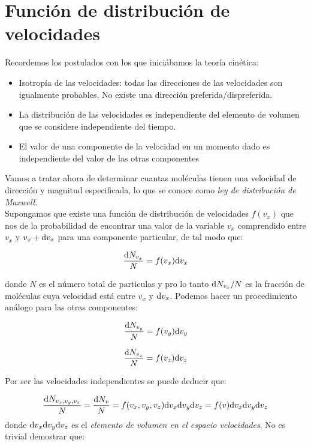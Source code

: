 \documentclass[12pt]{book}
\begin{document}
\section{Función de distribución de velocidades}

Recordemos los postulados con los que iniciábamos la teoría cinética:

\begin{itemize}
\item Isotropía de las velocidades: todas las direcciones de las velocidades son igualmente probables. No existe una dirección preferida/dispreferida.
\item La distribución de las velocidades es independiente del elemento de volumen que se considere independiente del tiempo.
\item El valor de una componente de la velocidad en un momento dado es independiente del valor de las otras componentes
\end{itemize}

Vamos a tratar ahora de determinar cuantas moléculas tienen una velocidad de dirección y magnitud especificada, lo que se conoce como \textit{ley de distribución de Maxwell}. \\


Supongamos que existe una función de distribución de velocidades $f(v_x)$ que nos de la probabilidad de encontrar una valor de la variable $v_x$ comprendido entre $v_x$ y $v_x + \mathrm{d} v_x$ para una componente particular, de tal modo que: 

\begin{equation}
\dfrac{\mathrm{d} N_{v_x}}{N} = f(v_x) \mathrm{d} v_x \label{ec:7.1-001}
\end{equation}

donde $N$ es el número total de particulas y pro lo tanto $\mathrm{d} N_{v_x} / N$ es la fracción de moléculas cuya velocidad está entre $v_x$ y $\mathrm{d} v_x$. Podemos hacer un procedimiento análogo para las otras componentes:

\begin{equation}
\dfrac{\mathrm{d} N_{v_y}}{N} = f(v_y) \mathrm{d} v_y
\end{equation}

\begin{equation}
\dfrac{\mathrm{d} N_{v_z}}{N} = f(v_z) \mathrm{d} v_z
\end{equation}

Por ser las velocidades independientes se puede deducir que:

\begin{equation}
\dfrac{\mathrm{d} N_{v_x, v_y, v_z}}{N} = \dfrac{\mathrm{d} N_v}{N} = f(v_x, v_y, v_z) \mathrm{d} v_x  \mathrm{d} v_y \mathrm{d} v_z = f(v)  \mathrm{d} v_x \mathrm{d} v_y \mathrm{d} v_z
\end{equation}
donde $  \mathrm{d} v_x \mathrm{d} v_y \mathrm{d} v_z$ es el \textit{elemento de volumen en el espacio velocidades}. No es trivial demostrar que:
\end{document}
